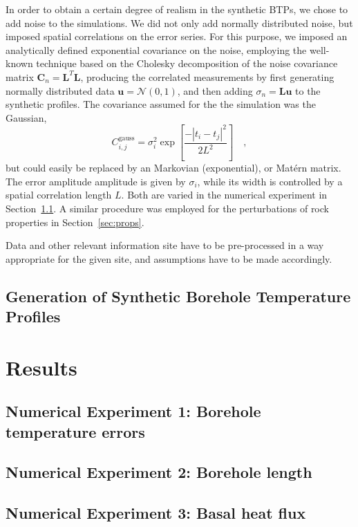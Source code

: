 \documentclass[cp]{copernicus}
\begin{document}
In order to obtain a certain degree of realism in the synthetic BTPs, we chose to add noise to the 
simulations. We did not only add normally distributed noise, but imposed spatial correlations on 
the error series. For this purpose, we imposed an analytically defined exponential covariance on the 
noise, employing the well-known technique based on the Cholesky decomposition of the noise 
covariance matrix $\mathbf{C}_{n}=\mathbf{L}^T\mathbf{L}$, producing the correlated measurements 
by first generating normally distributed data $\mathbf{u}=\mathcal{N}(0,1)$, and then adding 
$\sigma_n = \mathbf{L}\mathbf{u}$ to the synthetic profiles. The covariance assumed for the  the 
simulation was the Gaussian, 
\begin{equation}\label{eqn:covg}
C_{i,j}^{{\text{gauss}}} = \sigma _i^2\exp \left[ {\frac{{ - {{\left| {{t_i} - 
{t_j}} \right|}^2}}}{{2{L^2}}}} \right] \quad , 
\end{equation}  
\noindent but could easily be replaced by an Markovian (exponential), or Mat\'ern matrix. The error 
amplitude amplitude is given by $\sigma_i$, while its width is controlled by a spatial
correlation length $L$. Both are varied in the numerical experiment in Section~\ref{sec:errors}. A 
similar procedure was employed for the perturbations of rock properties in Section~\ref{sec:props}.



Data and other relevant information site have to be pre-processed in a way appropriate for the 
given 
site, and assumptions have to be made accordingly. 

\subsection{Generation of Synthetic Borehole Temperature Profiles}

\section{Results}
\subsection{Numerical Experiment 1: Borehole temperature errors}\label{sec:errors}
\subsection{Numerical Experiment 2: Borehole length}\label{sec:length}
\subsection{Numerical Experiment 3: Basal heat flux}\label{sec:qb}
\end{document}
